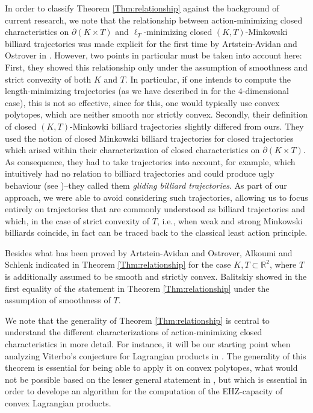 \documentclass[12pt]{amsart}
\theoremstyle{plain}
\theoremstyle{remark}
\theoremstyle{definition}
\newcommand{\R}{\mathbb{R}}
\begin{document}
In order to classify Theorem \ref{Thm:relationship} against the background of current research, we note that the relationship between action-minimizing closed characteristics on $\partial (K\times T)$ and $\ell_T$-minimizing closed $(K,T)$-Minkowski billiard trajectories was made explicit for the first time by Artstein-Avidan and Ostrover in \cite{ArtOst2012}. However, two points in particular must be taken into account here: First, they showed this relationship only under the assumption of smoothness and strict convexity of both $K$ and $T$. In particular, if one intends to compute the length-minimizing trajectories (as we have described in \cite{KruppRudolf2022} for the $4$-dimensional case), this is not so effective, since for this, one would typically use convex polytopes, which are neither smooth nor strictly convex. Secondly, their definition of closed $(K,T)$-Minkowki billiard trajectories slightly differed from ours. They used the notion of closed Minkowski billiard trajectories for closed trajectories which arised within their characterization of closed characteristics on $\partial (K\times T)$. As consequence, they had to take trajectories into account, for example, which intuitively had no relation to billiard trajectories and could produce ugly behaviour (see \cite{Halpern1977})--they called them \textit{gliding billiard trajectories}. As part of our approach, we were able to avoid considering such trajectories, allowing us to focus entirely on trajectories that are commonly understood as billiard trajectories and which, in the case of strict convexity of $T$, i.e., when weak and strong Minkowski billiards coincide, in fact can be traced back to the classical least action principle.

Besides what has been proved by Artstein-Avidan and Ostrover, Alkoumi and Schlenk indicated in \cite{AlkoumiSchlenk2014} Theorem \ref{Thm:relationship} for the case $K,T\subset\R^2$, where $T$ is additionally assumed to be smooth and strictly convex. Balitskiy showed in \cite{Balitskiy2018} the first equality of the statement in Theorem \ref{Thm:relationship} under the assumption of smoothness of $T$.

We note that the generality of Theorem \ref{Thm:relationship} is central to understand the different characterizations of action-minimizing closed characteristics in more detail. For instance, it will be our starting point when analyzing Viterbo's conjecture for Lagrangian products in \cite{Rudolf2022c}. The generality of this theorem is essential for being able to apply it on convex polytopes, what would not be possible based on the lesser general statement in \cite{ArtOst2012}, but which is essential in order to develope an algorithm for the computation of the EHZ-capacity of convex Lagrangian products.
\end{document}
